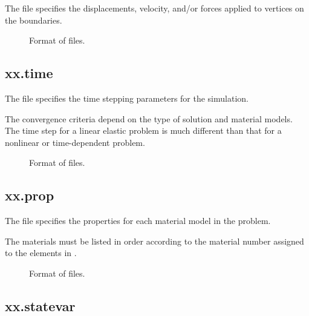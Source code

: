 The  file specifies the displacements, velocity,
and/or forces applied to vertices on the boundaries.

\begin{figure}[htbp]
  \begin{center}
    
    \caption{Format of  files.}
  \end{center}
\end{figure}

\subsection{xx.time}

The  file specifies the time stepping parameters for
the simulation.

\begin{warning}
  The convergence criteria depend on the type of solution and material
  models. The time step for a linear elastic problem is much different
  than that for a nonlinear or time-dependent problem.
\end{warning}

\begin{figure}[htbp]
  \begin{center}
    
    \caption{Format of  files.}
  \end{center}
\end{figure}

\subsection{xx.prop}

The  file specifies the properties for each material
model in the problem.

\begin{warning}
  The materials must be listed in order according to the material
  number assigned to the elements in .
\end{warning}

\begin{figure}[htbp]
  \begin{center}
    
    \caption{Format of  files.}
  \end{center}
\end{figure}

\subsection{xx.statevar}

